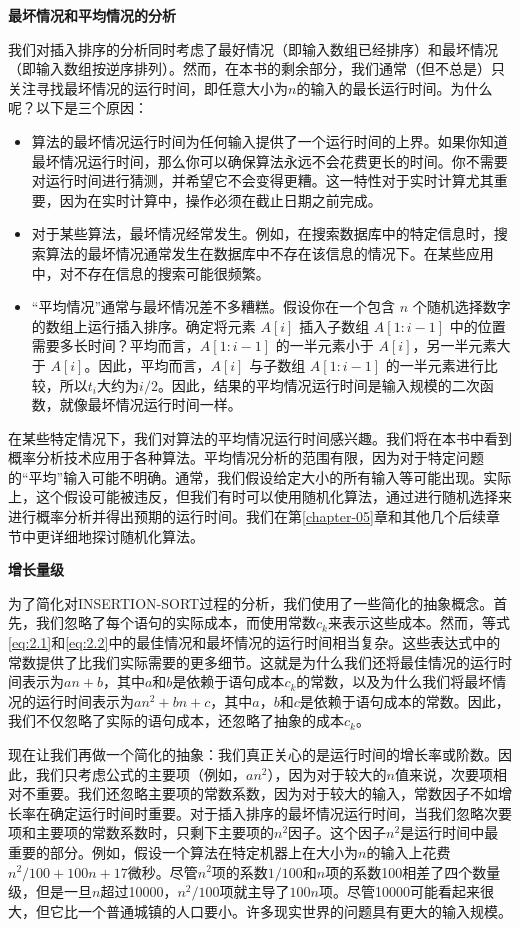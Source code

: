 \documentclass[lang=cn,newtx,10pt,scheme=chinese]{elegantbook}
\begin{document}
\textbf{最坏情况和平均情况的分析}

我们对插入排序的分析同时考虑了最好情况（即输入数组已经排序）和最坏情况（即输入数组按逆序排列）。然而，在本书的剩余部分，我们通常（但不总是）只关注寻找最坏情况的运行时间，即任意大小为$n$的输入的最长运行时间。为什么呢？以下是三个原因：

\begin{itemize}
    \item 算法的最坏情况运行时间为任何输入提供了一个运行时间的上界。如果你知道最坏情况运行时间，那么你可以确保算法永远不会花费更长的时间。你不需要对运行时间进行猜测，并希望它不会变得更糟。这一特性对于实时计算尤其重要，因为在实时计算中，操作必须在截止日期之前完成。
    \item 对于某些算法，最坏情况经常发生。例如，在搜索数据库中的特定信息时，搜索算法的最坏情况通常发生在数据库中不存在该信息的情况下。在某些应用中，对不存在信息的搜索可能很频繁。
    \item ``平均情况''通常与最坏情况差不多糟糕。假设你在一个包含 $n$ 个随机选择数字的数组上运行插入排序。确定将元素 $A[i]$ 插入子数组 $A[1:i-1]$ 中的位置需要多长时间？平均而言，$A[1:i-1]$ 的一半元素小于 $A[i]$，另一半元素大于 $A[i]$。因此，平均而言，$A[i]$ 与子数组 $A[1:i-1]$ 的一半元素进行比较，所以$t_i$大约为$i/2$。因此，结果的平均情况运行时间是输入规模的二次函数，就像最坏情况运行时间一样。
\end{itemize}

在某些特定情况下，我们对算法的平均情况运行时间感兴趣。我们将在本书中看到概率分析技术应用于各种算法。平均情况分析的范围有限，因为对于特定问题的``平均''输入可能不明确。通常，我们假设给定大小的所有输入等可能出现。实际上，这个假设可能被违反，但我们有时可以使用随机化算法，通过进行随机选择来进行概率分析并得出预期的运行时间。我们在第\ref{chapter-05}章和其他几个后续章节中更详细地探讨随机化算法。

\textbf{增长量级}

为了简化对INSERTION-SORT过程的分析，我们使用了一些简化的抽象概念。首先，我们忽略了每个语句的实际成本，而使用常数$c_k$来表示这些成本。然而，等式\eqref{eq:2.1}和\eqref{eq:2.2}中的最佳情况和最坏情况的运行时间相当复杂。这些表达式中的常数提供了比我们实际需要的更多细节。这就是为什么我们还将最佳情况的运行时间表示为$an+b$，其中$a$和$b$是依赖于语句成本$c_k$的常数，以及为什么我们将最坏情况的运行时间表示为$an^2+bn+c$，其中$a$，$b$和$c$是依赖于语句成本的常数。因此，我们不仅忽略了实际的语句成本，还忽略了抽象的成本$c_k$。

现在让我们再做一个简化的抽象：我们真正关心的是运行时间的增长率或阶数。因此，我们只考虑公式的主要项（例如，$an^2$），因为对于较大的$n$值来说，次要项相对不重要。我们还忽略主要项的常数系数，因为对于较大的输入，常数因子不如增长率在确定运行时间时重要。对于插入排序的最坏情况运行时间，当我们忽略次要项和主要项的常数系数时，只剩下主要项的$n^2$因子。这个因子$n^2$是运行时间中最重要的部分。例如，假设一个算法在特定机器上在大小为$n$的输入上花费$n^2/100 + 100n + 17$微秒。尽管$n^2$项的系数$1/100$和$n$项的系数100相差了四个数量级，但是一旦$n$超过10000，$n^2/100$项就主导了$100n$项。尽管10000可能看起来很大，但它比一个普通城镇的人口要小。许多现实世界的问题具有更大的输入规模。
\end{document}
